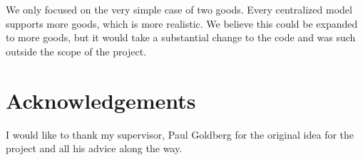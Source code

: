 \documentclass[12pt,a4paper,titlepage]{article}
\begin{document}
We only focused on the very simple case of two goods.
Every centralized model supports more goods, which is more realistic.
We believe this could be expanded to more goods, but it would take a substantial change to the code and was such outside the scope of the project.



\section{Acknowledgements}\label{acknowledgements}
I would like to thank my supervisor, Paul Goldberg for the original idea for the project and all his advice along the way.


\printbibliography
\end{document}
